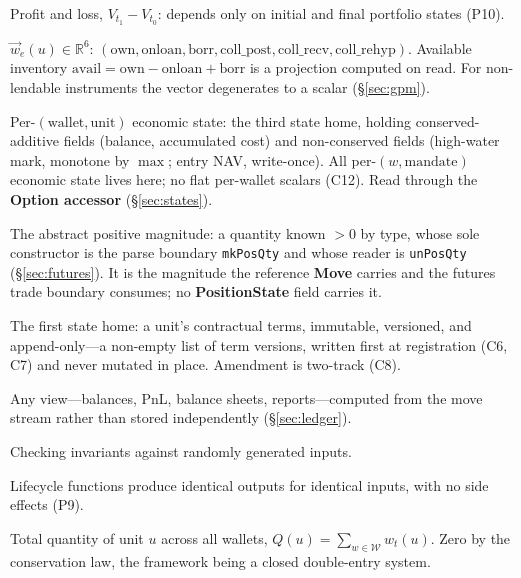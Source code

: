 \documentclass[11pt,a4paper]{article}
\begin{document}
\begin{description}[style=nextline]
\item[PnL] Profit and loss, $V_{t_1}-V_{t_0}$: depends only on initial and final portfolio states (P10).

\item[Position vector] $\vec{w}_e(u)\in\mathbb{R}^6$: $(\mathrm{own},\mathrm{onloan},\mathrm{borr},\mathrm{coll\_post},\mathrm{coll\_recv},\mathrm{coll\_rehyp})$. Available inventory $\mathrm{avail}=\mathrm{own}-\mathrm{onloan}+\mathrm{borr}$ is a projection computed on read. For non-lendable instruments the vector degenerates to a scalar (\S\ref{sec:gpm}).

\item[PositionState] Per-$(\text{wallet},\text{unit})$ economic state: the third state home, holding conserved-additive fields (balance, accumulated cost) and non-conserved fields (high-water mark, monotone by $\max$; entry NAV, write-once). All per-$(w,\text{mandate})$ economic state lives here; no flat per-wallet scalars (C12). Read through the \textbf{Option accessor} (\S\ref{sec:states}).

\item[PosQty] The abstract positive magnitude: a quantity known $>0$ by type, whose sole constructor is the parse boundary \texttt{mkPosQty} and whose reader is \texttt{unPosQty} (\S\ref{sec:futures}). It is the magnitude the reference \textbf{Move} carries and the futures trade boundary consumes; no \textbf{PositionState} field carries it.

\item[ProductTerms] The first state home: a unit's contractual terms, immutable, versioned, and append-only---a non-empty list of term versions, written first at registration (C6, C7) and never mutated in place. Amendment is two-track (C8).

\item[Projection] Any view---balances, PnL, balance sheets, reports---computed from the move stream rather than stored independently (\S\ref{sec:ledger}).

\item[Property-based testing] Checking invariants against randomly generated inputs.

\item[Purity] Lifecycle functions produce identical outputs for identical inputs, with no side effects (P9).

\item[$Q(u)$] Total quantity of unit $u$ across all wallets, $Q(u)=\sum_{w\in\mathcal{W}}w_t(u)$. Zero by the conservation law, the framework being a closed double-entry system.


\end{description}
\end{document}
